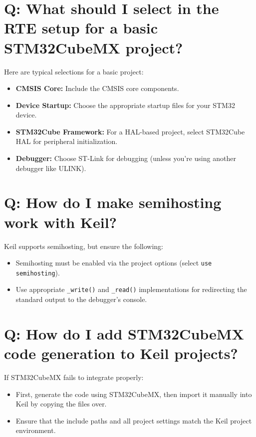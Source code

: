\documentclass{article}
\begin{document}
\section*{Q: What should I select in the RTE setup for a basic STM32CubeMX project?}

Here are typical selections for a basic project:

\begin{itemize}
    \item \textbf{CMSIS Core:} Include the CMSIS core components.
    \item \textbf{Device Startup:} Choose the appropriate startup files for your STM32 device.
    \item \textbf{STM32Cube Framework:} For a HAL-based project, select STM32Cube HAL for peripheral initialization.
    \item \textbf{Debugger:} Choose ST-Link for debugging (unless you’re using another debugger like ULINK).
\end{itemize}

\section*{Q: How do I make semihosting work with Keil?}

Keil supports semihosting, but ensure the following:
\begin{itemize}
    \item Semihosting must be enabled via the project options (select \texttt{use semihosting}).
    \item Use appropriate \texttt{\_write()} and \texttt{\_read()} implementations for redirecting the standard output to the debugger's console.
\end{itemize}

\section*{Q: How do I add STM32CubeMX code generation to Keil projects?}

If STM32CubeMX fails to integrate properly:
\begin{itemize}
    \item First, generate the code using STM32CubeMX, then import it manually into Keil by copying the files over.
    \item Ensure that the include paths and all project settings match the Keil project environment.
\end{itemize}
\end{document}
